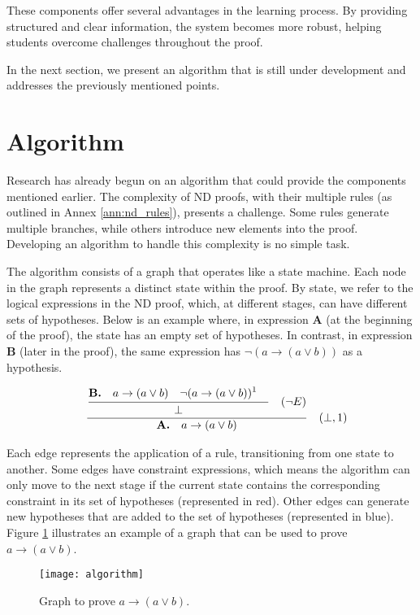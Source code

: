 These components offer several advantages in the learning process. By providing structured and clear information, the system becomes more robust, helping students overcome challenges throughout the proof.

In the next section, we present an algorithm that is still under development and addresses the previously mentioned points.

\section{Algorithm}
Research has already begun on an algorithm that could provide the components mentioned earlier. The complexity of \gls{ND} proofs, with their multiple rules (as outlined in Annex \ref{ann:nd_rules}), presents a challenge. Some rules generate multiple branches, while others introduce new elements into the proof. Developing an algorithm to handle this complexity is no simple task.

The algorithm consists of a graph that operates like a state machine. Each node in the graph represents a distinct state within the proof. By state, we refer to the logical expressions in the \gls{ND} proof, which, at different stages, can have different sets of hypotheses. Below is an example where, in expression \textbf{A} (at the beginning of the proof), the state has an empty set of hypotheses. In contrast, in expression \textbf{B} (later in the proof), the same expression has \(\neg(a \to (a \lor b))\) as a hypothesis.

\[
\begin{array}{c c}
   \quad \frac{\displaystyle \frac{\displaystyle 
    {\displaystyle \textbf{B.} \quad a \to (a \lor b) \strut} \quad \neg(a \to (a \lor b))^1 \quad \strut} {\displaystyle \bot \strut} \quad (\neg E) \strut}
    {\displaystyle \textbf{A.} \quad a \to (a \lor b)\strut} \quad (\bot, 1) 
\end{array}
\]

Each edge represents the application of a rule, transitioning from one state to another. Some edges have constraint expressions, which means the algorithm can only move to the next stage if the current state contains the corresponding constraint in its set of hypotheses (represented in red). Other edges can generate new hypotheses that are added to the set of hypotheses (represented in blue). Figure \ref{img:algorithm} illustrates an example of a graph that can be used to prove \(a \to (a \lor b)\).

\begin{figure}[htbp]
    \centering
    \texttt{[image: algorithm]}
    \caption{Graph to prove \(a \to (a \lor b)\).}
    \label{img:algorithm}
\end{figure}

